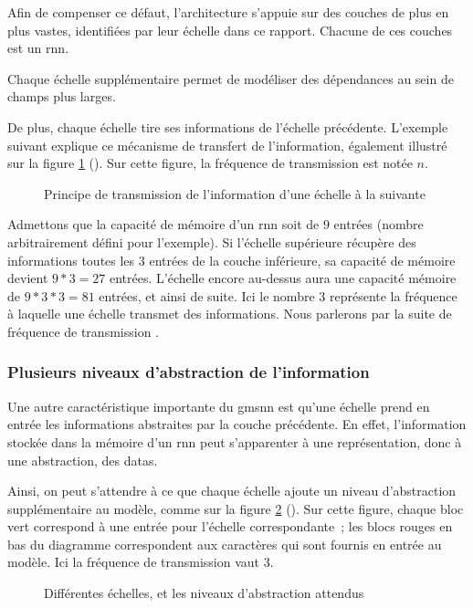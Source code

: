 {Afin de compenser ce défaut, l'architecture  s'appuie sur des couches de plus en plus vastes, identifiées par leur échelle dans ce rapport.
Chacune de ces couches est un \gls{rnn}.

Chaque échelle supplémentaire permet de modéliser des dépendances au sein de champs plus larges.

De plus, chaque échelle tire ses informations de l'échelle précédente.
L'exemple suivant explique ce mécanisme de transfert de l'information, également illustré sur la figure \ref{fig:gmsnn_transmit} (). Sur cette figure, la fréquence de transmission est notée $n$.

\begin{figure}[ht]
	\centering
	
	\caption{Principe de transmission de l'information d'une échelle à la suivante}
	\label{fig:gmsnn_transmit}
\end{figure}

Admettons que la capacité de mémoire d'un \gls{rnn} soit de $9$ entrées (nombre arbitrairement défini pour l'exemple).
Si l'échelle supérieure récupère des informations toutes les $3$ entrées de la couche inférieure, sa capacité de mémoire devient $9*3=27$ entrées.
L'échelle encore au-dessus aura une capacité mémoire de  $9*3*3=81$ entrées, et ainsi de suite.
Ici le nombre $3$ représente la fréquence à laquelle une échelle transmet des informations. Nous parlerons par la suite de \og fréquence de transmission \fg{}.

\subsubsection{Plusieurs niveaux d'abstraction de l'information}
Une autre caractéristique importante du \gls{gmsnn} est qu'une échelle prend en entrée les informations abstraites par la couche précédente. En effet, l'information stockée dans la mémoire d'un \gls{rnn} peut s'apparenter à une représentation, donc à une abstraction, des \glspl{data}.

Ainsi, on peut s'attendre à ce que chaque échelle ajoute un niveau d'abstraction supplémentaire au modèle, comme sur la figure \ref{fig:gmsnn_ms} ().
Sur cette figure, chaque bloc vert correspond à une entrée pour l'échelle correspondante~; les blocs rouges en bas du diagramme correspondent aux caractères qui sont fournis en entrée au modèle.
Ici la fréquence de transmission vaut 3.

\begin{figure}[ht]
	\centering
	
	\caption{%
		Différentes échelles, et les niveaux d'abstraction attendus}
	\label{fig:gmsnn_ms}
\end{figure}


}
